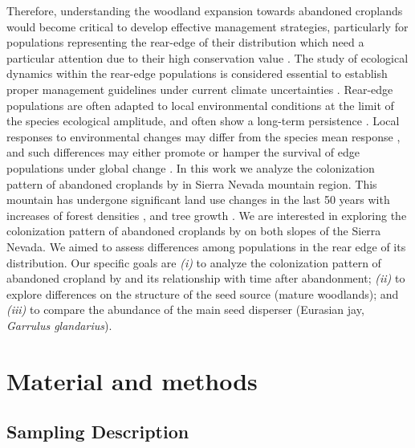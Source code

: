 Therefore, understanding the woodland expansion towards abandoned croplands would become critical to develop effective management strategies, particularly for populations representing the rear-edge of their distribution \autocite{HampePetit2005ConservingBiodiversity} which need a particular attention due to their high conservation value \autocite{Fadyetal2016EvolutionbasedApproach}.  
The study of ecological dynamics within the rear-edge populations is considered essential to establish proper management guidelines under current climate uncertainties \autocites{Fadyetal2016EvolutionbasedApproach,Jumpetal2010MonitoringManaging}. Rear-edge populations are often adapted to local environmental conditions at the limit of the species ecological amplitude, and often show a long-term persistence \autocite{HampePetit2005ConservingBiodiversity}. Local responses to environmental changes may differ from the species mean response \autocites{Benavidesetal2013DirectIndirect,Matiasetal2017ContrastingGrowth,Castroetal2004SeedlingEstablishment}, and such differences may either promote or hamper the survival of edge populations under global change \autocites{Fadyetal2016EvolutionbasedApproach,Jumpetal2010MonitoringManaging}. In this work we analyze the colonization pattern of abandoned croplands by \Qpy in Sierra Nevada mountain region. This mountain has undergone significant land use changes in the last 50 years \autocites{JimenezOlivenciaetal2015EvolucionUsos} with increases of forest densities \autocite[see chapter \ref{sec:carbon}; also][]{JimenezOlivenciaetal2015MedioSiglo}, and tree growth \autocite[see chapter \ref{sec:dendro};][]{PerezLuqueetal2020LanduseLegacies}. We are interested in exploring the colonization pattern of abandoned croplands by \Qp on both slopes of the Sierra Nevada. We aimed to assess differences among populations in the rear edge of its distribution. Our specific goals are \emph{(i)} to analyze the colonization pattern of abandoned cropland by \Qp and its relationship with time after abandonment; \emph{(ii)} to explore differences on the structure of the seed source (mature woodlands); and \emph{(iii)} to compare the abundance of the main seed disperser (Eurasian jay, \emph{Garrulus glandarius}).

\section{Material and methods}\label{sec:coloniza:MatMet}
\subsection{Sampling Description}\label{sec:coloniza:sampling}


